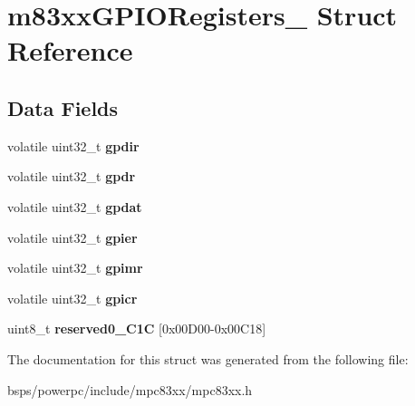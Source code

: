 \hypertarget{structm83xxGPIORegisters__}{}\section{m83xx\+G\+P\+I\+O\+Registers\+\_\+ Struct Reference}
\label{structm83xxGPIORegisters__}
\subsection*{Data Fields}
\begin{DoxyCompactItemize}
\item 
\mbox{\label{structm83xxGPIORegisters___af2d58b28f96539ea451c75260fc1e3da}} 
volatile uint32\+\_\+t {\bfseries gpdir}
\item 
\mbox{\label{structm83xxGPIORegisters___a358fc324710f67e707964a2606ccf05a}} 
volatile uint32\+\_\+t {\bfseries gpdr}
\item 
\mbox{\label{structm83xxGPIORegisters___af7634d4134d355a8e255cb2d8fa0827e}} 
volatile uint32\+\_\+t {\bfseries gpdat}
\item 
\mbox{\label{structm83xxGPIORegisters___a381e39038bbb8ad52a27d8da54ff0a7c}} 
volatile uint32\+\_\+t {\bfseries gpier}
\item 
\mbox{\label{structm83xxGPIORegisters___aae326c0c9fd8c7ee211cc7d6237436bd}} 
volatile uint32\+\_\+t {\bfseries gpimr}
\item 
\mbox{\label{structm83xxGPIORegisters___a57c2a093f8cd7e1bac205d78f4c4ee2f}} 
volatile uint32\+\_\+t {\bfseries gpicr}
\item 
\mbox{\label{structm83xxGPIORegisters___acc38482a0ee93f5d20cd5100f01d1904}} 
uint8\+\_\+t {\bfseries reserved0\+\_\+C1C} \mbox{[}0x00\+D00-\/0x00\+C18\mbox{]}
\end{DoxyCompactItemize}


The documentation for this struct was generated from the following file\+:\begin{DoxyCompactItemize}
\item 
bsps/powerpc/include/mpc83xx/mpc83xx.\+h\end{DoxyCompactItemize}
